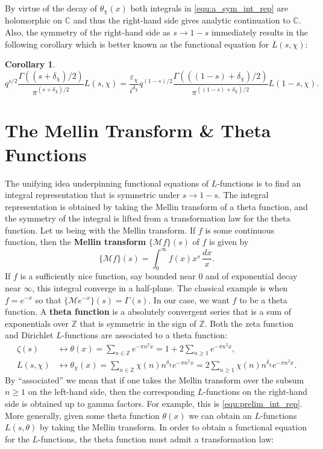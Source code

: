\documentclass[12pt,reqno]{amsart}
\newtheorem{corollary}[theorem]{Corollary}
\theoremstyle{definition}
\numberwithin{equation}{section}
\newcommand{\C}{{\mathbb C}}
\begin{document}
    By virtue of the decay of $\theta_{\chi}(x)$ both integrals in \ref{equ:a_sym_int_rep} are holomorphic on $\C$ and thus the right-hand side gives analytic continuation to $\C$. Also, the symmetry of the right-hand side as $s \to 1-s$ immediately results in the following corollary which is better known as the functional equation for $L(s,\chi)$:

    \begin{corollary}
     \[
        q^{s/2}\frac{\Gamma\left((s+\delta_{\chi})/2\right)}{\pi^{(s+\delta_{\chi})/2}}L(s,\chi) = \frac{\varepsilon_{\chi}}{i^{\delta_{\chi}}}q^{(1-s)/2}\frac{\Gamma\left(((1-s)+\delta_{\chi})/2\right)}{\pi^{((1-s)+\delta_{\chi})/2}}L(1-s,\chi).
    \]
    \end{corollary}

\section{The Mellin Transform \& Theta Functions}
    The unifying idea underpinning functional equations of $L$-functions is to find an integral representation that is symmetric under $s \to 1-s$. The integral representation is obtained by taking the Mellin transform of a theta function, and the symmetry of the integral is lifted from a transformation law for the theta function. Let us being with the Mellin transform. If $f$ is some continuous function, then the \textbf{Mellin transform} $\{\mathcal{M}f\}(s)$ of $f$ is given by
    \[
      \{\mathcal{M}f\}(s) = \int_{0}^{\infty}f(x)x^{s}\,\frac{dx}{x}.
    \]
    If $f$ is a sufficiently nice function, say bounded near $0$ and of exponential decay near $\infty$, this integral converge in a half-plane. The classical example is when $f = e^{-x}$ so that $\{\mathcal{M}e^{-x}\}(s) = \Gamma(s)$. In our case, we want $f$ to be a theta function. A \textbf{theta function} is a absolutely convergent series that is a sum of exponentials over $\mathbb{Z}$ that is symmetric in the sign of $\mathbb{Z}$. Both the zeta function and Dirichlet $L$-functions are associated to a theta function:
    \begin{align*}
      \zeta(s) &\longleftrightarrow \theta(x) = \sum_{n \in \mathbb{Z}}e^{-\pi n^{2}x} = 1+2\sum_{n \ge 1}e^{-\pi n^{2}x}, \\
      L(s,\chi) &\longleftrightarrow \theta_{\chi}(x) = \sum_{n \in \mathbb{Z}}\chi(n)n^{\delta_{\chi}}e^{-\pi n^{2}x} = 2\sum_{n \ge 1}\chi(n)n^{\delta_{\chi}}e^{-\pi n^{2}x}.
    \end{align*}
    By ``associated'' we mean that if one takes the Mellin transform over the subsum $n \ge 1$ on the left-hand side, then the corresponding $L$-functions on the right-hand side is obtained up to gamma factors. For example, this is \ref{equ:prelim_int_rep}. More generally, given some theta function $\theta(x)$ we can obtain an $L$-functions $L(s,\theta)$ by taking the Mellin transform. In order to obtain a functional equation for the $L$-functions, the theta function must admit a transformation law:
\end{document}
